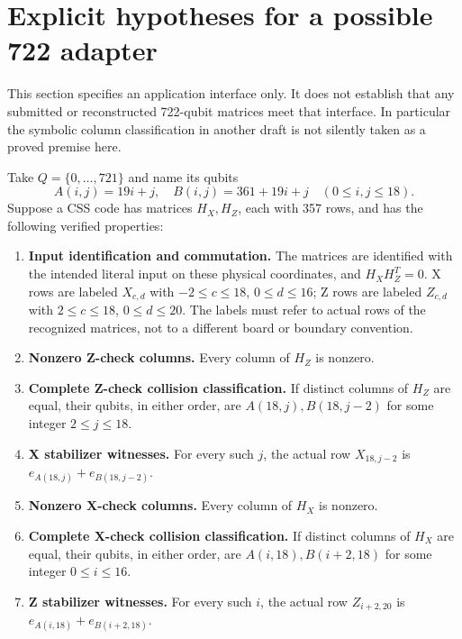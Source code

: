 \documentclass{article}
\begin{document}
\section{Explicit hypotheses for a possible 722 adapter}\label{sec:adapter}

This section specifies an application interface only. It does not establish that any
submitted or reconstructed 722-qubit matrices meet that interface. In particular the
symbolic column classification in another draft is not silently taken as a proved premise
here.

Take \(Q = \{0, \dots, 721\}\) and name its qubits
\begin{equation}
  A(i, j) = 19i + j, \quad B(i, j) = 361 + 19i + j \quad (0 \le i, j \le 18).
\end{equation}
Suppose a CSS code has matrices \(H_X, H_Z\), each with 357 rows, and has the following
verified properties:
\begin{enumerate}
  \item \textbf{Input identification and commutation.} The matrices are identified with
    the intended literal input on these physical coordinates, and \(H_X H_Z^T = 0\). X rows
    are labeled \(X_{c,d}\) with \(-2 \le c \le 18\), \(0 \le d \le 16\); Z rows are
    labeled \(Z_{c,d}\) with \(2 \le c \le 18\), \(0 \le d \le 20\). The labels must refer
    to actual rows of the recognized matrices, not to a different board or boundary
    convention.
  \item \textbf{Nonzero Z-check columns.} Every column of \(H_Z\) is nonzero.
  \item \textbf{Complete Z-check collision classification.} If distinct columns of \(H_Z\)
    are equal, their qubits, in either order, are \(A(18, j), B(18, j - 2)\) for some
    integer \(2 \le j \le 18\).
  \item \textbf{X stabilizer witnesses.} For every such \(j\), the actual row
    \(X_{18,j-2}\) is \(e_{A(18,j)} + e_{B(18,j-2)}\).
  \item \textbf{Nonzero X-check columns.} Every column of \(H_X\) is nonzero.
  \item \textbf{Complete X-check collision classification.} If distinct columns of \(H_X\)
    are equal, their qubits, in either order, are \(A(i, 18), B(i + 2, 18)\) for some
    integer \(0 \le i \le 16\).
  \item \textbf{Z stabilizer witnesses.} For every such \(i\), the actual row
    \(Z_{i+2,20}\) is \(e_{A(i,18)} + e_{B(i+2,18)}\).
\end{enumerate}
\end{document}
